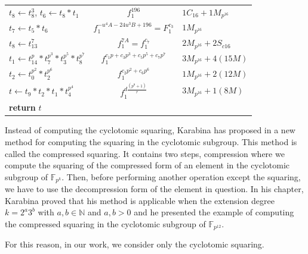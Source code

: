\begin{center}
\begin{table}[!ht]
{\begin{tabular}{l|c|l}
			$t_{8} \leftarrow t_{8}^3$, $t_{6} \leftarrow t_{8}*t_{1}$&$f_1^{196}$&$1C_{16}+1M_{p^{16}}$\\
			$t_{7} \leftarrow t_{5}*t_{6}$&$f_1^{-u^4A-24u^3B+196}=F_1^{c_3}$&$1M_{p^{16}}$\\
			$t_{8} \leftarrow t_{13}^{7}$&$f_1^{7A}=f_1^{c_7}$&$2M_{p^{16}}+2S_{c16}$\\
			$t_{1} \leftarrow t_{14}^{p}* t_{7}^{p^3}* t_{3}^{p^5}* t_{8}^{p^7}$&$f_1^{c_1p+c_3p^3+c_5p^5+c_7p^7}$&$3M_{p^{16}}+4(15M)$\\
			$t_{2} \leftarrow t_{0}^{p^2}* t_{2}^{p^6}$&$f_1^{c_2p^2+c_6p^6}$&$1M_{p^{16}}+2(12M)$\\
			$t \leftarrow t_{9}*t_{2}*t_{1}*t_{4}^{p^4}$&$f_1^{d{\frac{(p^8+1)}{r}}}$&$3M_{p^{16}}+1(8M)$\\
			\textbf{return} $t$ & &\\
			\hline
		\end{tabular}
		}
	\end{table}
\end{center}
\vspace{8mm}


Instead of computing the cyclotomic squaring, Karabina has proposed in \cite{Karabina13Squaring} a new method for computing the squaring in the cyclotomic subgroup. This method is called the compressed squaring. It contains two steps, compression where we compute the squaring of the compressed form of an element in the cyclotomic subgroup of $\mathbb{F}_{p^k}$. Then, before performing another operation except the squaring, we have to use the decompression form of the element in question.
In his chapter, Karabina proved that his method is applicable when the extension degree $k=2^a3^b$ with $a, b \in \mathbb{N}$ and  $a, b>0$ and he presented the example of computing the compressed squaring in the cyclotomic subgroup of $\mathbb{F}_{p^{12}}$.

For this reason, in our work, we consider only the cyclotomic squaring.

